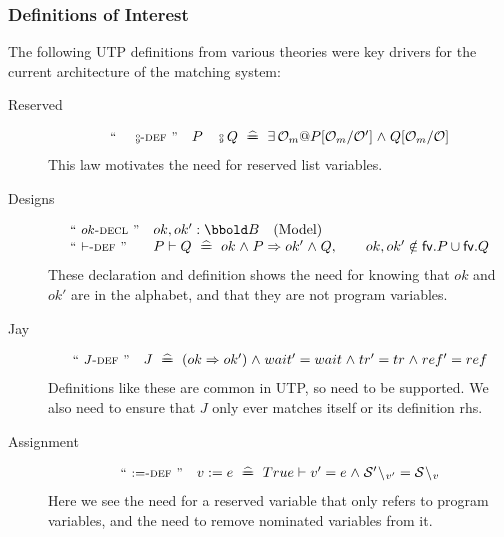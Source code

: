 \subsubsection{Definitions of Interest}

The following UTP definitions from various theories
were key drivers for the current architecture of the  matching system:
\begin{description}
  \item[Reserved]
    \[\begin{array}{l@{\quad}l}
       \LNAME{$\comp$-def} & P \comp Q \defs \exists \OBS_m @ P[\OBS_m/\OBS'] \land Q[\OBS_m/\OBS]
    \end{array}\]
    This law motivates the need for reserved list variables.
  \item[Designs]
    \[\begin{array}{l@{\quad}l}
       \LNAME{$ok$-decl} & ok,ok' : \Bool \quad \mbox{(Model)}
    \\
       \LNAME{$\design$-def} & P \design Q \defs ok \land P \implies ok' \land Q
       , \qquad ok,ok' \notin \fv.P \cup \fv.Q
    \end{array}\]
    These declaration and definition shows the need for knowing that $ok$ and $ok'$
    are in the alphabet, and that they are not program variables.
  \item[Jay]
    \[\begin{array}{l@{\quad}l}
       \LNAME{$J$-def} & J \defs (ok \implies ok') \land wait'=wait \land tr'=tr \land ref'=ref
    \end{array}\]
    Definitions like these are common in UTP, so need to be supported.
    We also need to ensure that $J$ only ever matches itself or its definition rhs.
  \item[Assignment]
    \[\begin{array}{l@{\quad}l}
       \LNAME{$:=$-def} & v:=e \defs True \design v' = e \land \SCR'\less{v'}=\SCR\less v
    \end{array}\]
    Here we see the need for a reserved variable that only refers to program variables,
    and the need to remove nominated variables from it.
\end{description}
